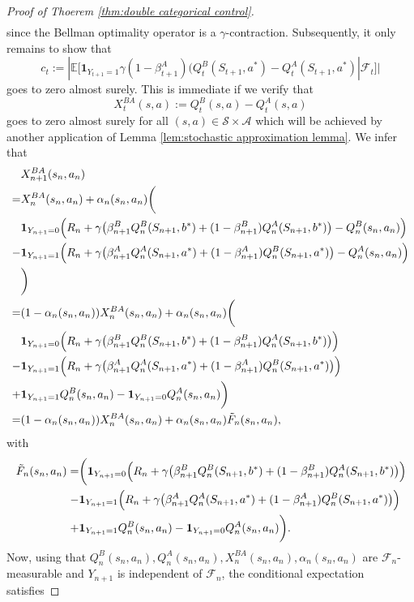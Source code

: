 \documentclass{article}
\newcommand{\cA}{\mathcal{A}}
\newcommand{\cF}{\mathcal{F}}
\newcommand{\cS}{\mathcal{S}}
\newcommand{\E}{\mathbb{E}}
\theoremstyle{plain}
\theoremstyle{definition}
\theoremstyle{remark}
\begin{document}
\begin{proof}[Proof of Thoerem \ref{thm:double categorical control}]
\begin{align*}
   \end{align*}
   since the Bellman optimality operator is a $\gamma$-contraction. Subsequently, it only remains to show that 
   \[c_t:=|\E[\textbf{1}_{Y_{t+1}=1}\gamma(1-\beta^A_{t+1})(Q_t^B(S_{t+1},a^*)-Q^A_t(S_{t+1},a^*)|\cF_t]|\]
   goes to zero almost surely. This is immediate if we verify that
   \[X_t^{BA}(s,a):=Q^B_t(s,a)-Q^A_t(s,a)\]
   goes to zero almost surely for all $(s,a)\in\cS\times\cA$ which will be achieved by another application of Lemma \ref{lem:stochastic approximation lemma}.
   We infer that
   \begin{align*}
       &X_{n+1}^{BA}(s_n,a_n)\\
       =&X_{n}^{BA}(s_n,a_n)+\alpha_n(s_n,a_n)\biggl(\\
       &\textbf{1}_{Y_{n+1}=0}\Bigl(R_n+\gamma\bigl(\beta_{n+1}^BQ^B_n(S_{n+1},b^*)+(1-\beta^B_{n+1})Q^A_n(S_{n+1},b^*)\bigr)-Q^B_n(s_n,a_n)\Bigr) \\
       - &\textbf{1}_{Y_{n+1}=1}\Bigl(R_n+\gamma\bigl(\beta_{n+1}^AQ^A_n(S_{n+1},a^*)+(1-\beta^A_{n+1})Q^B_n(S_{n+1},a^*)\bigr)-Q^A_n(s_n,a_n)\Bigr)\\
       &\biggr)\\
       =&(1-\alpha_n(s_n,a_n))X_{n}^{BA}(s_n,a_n)+\alpha_n(s_n,a_n)\biggl(\\
       &\textbf{1}_{Y_{n+1}=0}\Bigl(R_n+\gamma\bigl(\beta_{n+1}^BQ^B_n(S_{n+1},b^*)+(1-\beta^B_{n+1})Q^A_n(S_{n+1},b^*)\bigr)\Bigr) \\
       - &\textbf{1}_{Y_{n+1}=1}\Bigl(R_n+\gamma\bigl(\beta_{n+1}^AQ^A_n(S_{n+1},a^*)+(1-\beta^A_{n+1})Q^B_n(S_{n+1},a^*)\bigr)\Bigr)\\
       +&\textbf{1}_{Y_{n+1}=1}Q^B_n(s_n,a_n)-\textbf{1}_{Y_{n+1}=0} Q^A_n(s_n,a_n)\biggr)\\
       =&(1-\alpha_n(s_n,a_n))X_{n}^{BA}(s_n,a_n)+\alpha_n(s_n,a_n)\tilde F_n(s_n,a_n),
   \end{align*}
       with 
    \begin{align*}
        \tilde F_n(s_n,a_n)=&\biggl(
       \textbf{1}_{Y_{n+1}=0}\Bigl(R_n+\gamma\bigl(\beta_{n+1}^BQ^B_n(S_{n+1},b^*)+(1-\beta^B_{n+1})Q^A_n(S_{n+1},b^*)\bigr)\Bigr) \\
       - &\textbf{1}_{Y_{n+1}=1}\Bigl(R_n+\gamma\bigl(\beta_{n+1}^AQ^A_n(S_{n+1},a^*)+(1-\beta^A_{n+1})Q^B_n(S_{n+1},a^*)\bigr)\Bigr)\\
       +&\textbf{1}_{Y_{n+1}=1}Q^B_n(s_n,a_n)-\textbf{1}_{Y_{n+1}=0} Q^A_n(s_n,a_n)\biggr).
    \end{align*}
    Now, using that $Q^B_n(s_n,a_n),Q^A_n(s_n,a_n),X_{n}^{BA}(s_n,a_n),\alpha_n(s_n,a_n)$ are $\cF_n$-measurable and $Y_{n+1}$ is independent of $\cF_n$, the conditional expectation satisfies

\end{proof}
\end{document}
